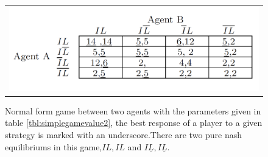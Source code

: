\begin{figure}[h]
\centering
\begin{tabular}{@{}c@{}}
\includegraphics[width=1.0\textwidth]{../Figures/NotOptimalGameWithNumbers.png}
\end{tabular}
\caption[Caption for LOF]{Normal form game between two agents with the parameters given in table \ref{tbl:simplegamevalue2}, the best response of a player to a given strategy is marked with an underscore.There are two pure nash equilibriums in this game,$IL,IL$ and $I\underline{L},I\underline{L}$. \label{fig:NFnumbersViolating}}
\end{figure}
